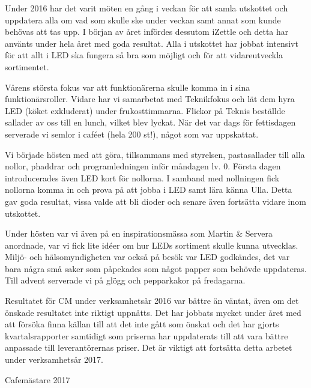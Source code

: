 \documentclass[../_main/handlingar.tex]{subfiles}
\begin{document}
Under 2016 har det varit möten en gång i veckan för att samla utskottet och uppdatera alla om vad som skulle ske under veckan samt annat som kunde behövas att tas upp. I början av året infördes dessutom iZettle och detta har använts under hela året med goda resultat. Alla i utskottet har jobbat intensivt för att allt i LED ska fungera så bra som möjligt och för att vidareutveckla sortimentet.

Vårens största fokus var att funktionärerna skulle komma in i sina funktionärsroller. Vidare har vi samarbetat med Teknikfokus och lät dem hyra LED (köket exkluderat) under frukosttimmarna. Flickor på Teknis beställde sallader av oss till en lunch, vilket blev lyckat. När det var dags för fettisdagen serverade vi semlor i caféet (hela 200 st!), något som var uppskattat.

Vi började hösten med att göra, tillsammans med styrelsen, pastasallader till alla nollor, phaddrar och programledningen inför måndagen lv. 0. Första dagen introducerades även LED kort för nollorna. I samband med nollningen fick nollorna komma in och prova på att jobba i LED samt lära känna Ulla. Detta gav goda resultat, vissa valde att bli dioder och senare även fortsätta vidare inom utskottet.

Under hösten var vi även på en inspirationsmässa som Martin \& Servera anordnade, var vi fick lite idéer om hur LEDs sortiment skulle kunna utvecklas. Miljö- och hälsomyndigheten var också på besök var LED godkändes, det var bara några små saker som påpekades som något papper som behövde uppdateras. Till advent serverade vi på glögg och pepparkakor på fredagarna.

Resultatet för CM under verksamhetsår 2016 var bättre än väntat, även om det önskade resultatet inte riktigt uppnåtts. Det har jobbats mycket under året med att försöka finna källan till att det inte gått som önskat och det har gjorts kvartalsrapporter samtidigt som priserna har uppdaterats till att vara bättre anpassade till leverantörernas priser. Det är viktigt att fortsätta detta arbetet under verksamhetsår 2017.
\begin{signatures}{1}
    \mvh
    \signature{Daniel Bakic}{Cafemästare 2017}
\end{signatures}
\end{document}
